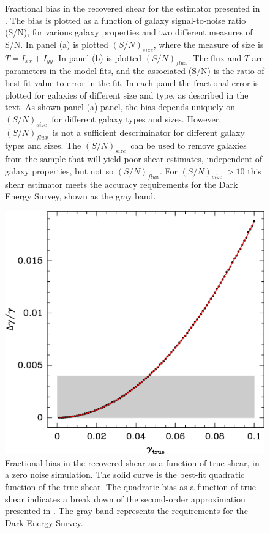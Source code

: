 \documentclass[12pt,preprint]{aastex}
\newcommand{\Tsn}{$(S/N)_{size}$}
\newcommand{\fsn}{$(S/N)_{flux}$}
\begin{document}
\begin{figure}[p]
 \caption{ Fractional bias in the recovered shear for the estimator presented
     in \cite{ba13}.  The bias is plotted as a
     function of galaxy signal-to-noise ratio (S/N), for various galaxy
     properties and two different measures of S/N.  In panel (a) is
     plotted \Tsn, where the measure of size is $T=I_{xx} + I_{yy}$.  In 
     panel (b) is plotted \fsn.  The flux and $T$ are parameters in the model
     fits, and the associated (S/N) is the ratio of best-fit value to error in
     the fit.  In each panel the fractional error is plotted for galaxies of
     different size and type, as described in the text.  As shown panel (a)
     panel, the bias depends uniquely on \Tsn\ for different galaxy types and
     sizes.  However, \fsn\ is not a sufficient descriminator for different
     galaxy types and sizes.  The \Tsn\ can be used to remove galaxies from the
     sample that will yield poor shear estimates, independent of galaxy
     properties, but not so \fsn.  For \Tsn$~ > 10$ this shear estimator meets
 the accuracy requirements for the Dark Energy Survey, shown as the gray band.
 \label{fig:fracerr}}

\end{figure}

\begin{figure}[t] \centering
 \centering 
 \includegraphics[scale=0.6]{figures/fracerr-vs-shear.eps}

 \caption{Fractional bias in the recovered shear as a function of true shear,
     in a zero noise simulation.  The solid curve is the best-fit quadratic
     function of the true shear.  The quadratic bias as a function of true
     shear indicates a break down of the second-order approximation presented
     in \cite{ba13}. The gray band represents the requirements for the Dark
 Energy Survey. \label{fig:nonoise}}

\end{figure}
\end{document}
